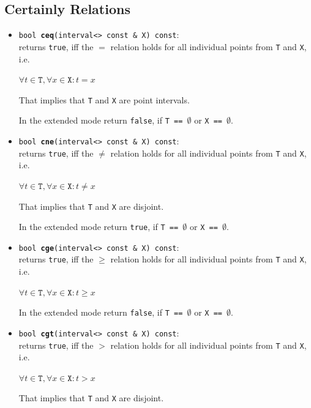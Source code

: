 \documentclass{report}
\begin{document}
\subsection{Certainly Relations}

	\begin{itemize}
		\item \texttt{bool {\bf ceq}(interval<> const \& X) const}:\\returns  \texttt{true}, iff the $=$ relation holds for all individual
			points from \texttt{T} and \texttt{X}, i.e.
\begin{center} $\forall t \in \texttt{T},\forall x \in \texttt{X}  :
			t = x $\end{center}
That implies that \texttt{T} and \texttt{X} are point intervals.

In the extended mode return \texttt{false}, if 
				\texttt{T == $\emptyset$} or
				\texttt{X == $\emptyset$}.

			\item \texttt{bool {\bf cne}(interval<> const \& X) const}:\\returns  \texttt{true}, iff the $\neq$ relation holds for all individual
			points from \texttt{T} and \texttt{X}, i.e.
\begin{center} $\forall t \in \texttt{T},\forall x \in \texttt{X}  :
			t \neq x $\end{center}
That implies that \texttt{T} and \texttt{X} are disjoint.

In the extended mode return \texttt{true}, if 
				\texttt{T == $\emptyset$} or \texttt{X == $\emptyset$}.
			\item \texttt{bool {\bf cge}(interval<> const \& X) const}:\\returns  \texttt{true}, iff the $\geq$ relation holds for all individual
			points from \texttt{T} and \texttt{X}, i.e.
\begin{center} $\forall t \in \texttt{T},\forall x \in \texttt{X}  :
			t \geq x $\end{center}

In the extended mode return \texttt{false}, if 
				\texttt{T == $\emptyset$} or \texttt{X == $\emptyset$}.
			\item \texttt{bool {\bf cgt}(interval<> const \& X) const}:\\returns  \texttt{true}, iff the $>$ relation holds for all individual
			points from \texttt{T} and \texttt{X}, i.e.
\begin{center} $\forall t \in \texttt{T},\forall x \in \texttt{X}  :
			t > x $\end{center}
That implies that \texttt{T} and \texttt{X} are disjoint.


\end{itemize}
\end{document}
